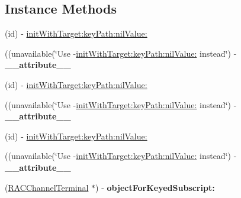 \subsection*{Instance Methods}
\begin{DoxyCompactItemize}
\item 
(id) -\/ \mbox{\hyperlink{interface_r_a_c_k_v_o_channel_a4a6f2925587bdcaf90419bae2da284a4}{init\+With\+Target\+:key\+Path\+:nil\+Value\+:}}
\item 
\mbox{\label{interface_r_a_c_k_v_o_channel_a42bbbc72fca05e4139053901df0c7a81}} 
((unavailable(\char`\"{}Use -\/\mbox{\hyperlink{interface_r_a_c_k_v_o_channel_a4a6f2925587bdcaf90419bae2da284a4}{init\+With\+Target\+:key\+Path\+:nil\+Value\+:}} instead\char`\"{}) -\/ {\bfseries \+\_\+\+\_\+attribute\+\_\+\+\_\+}
\item 
(id) -\/ \mbox{\hyperlink{interface_r_a_c_k_v_o_channel_a4a6f2925587bdcaf90419bae2da284a4}{init\+With\+Target\+:key\+Path\+:nil\+Value\+:}}
\item 
\mbox{\label{interface_r_a_c_k_v_o_channel_a42bbbc72fca05e4139053901df0c7a81}} 
((unavailable(\char`\"{}Use -\/\mbox{\hyperlink{interface_r_a_c_k_v_o_channel_a4a6f2925587bdcaf90419bae2da284a4}{init\+With\+Target\+:key\+Path\+:nil\+Value\+:}} instead\char`\"{}) -\/ {\bfseries \+\_\+\+\_\+attribute\+\_\+\+\_\+}
\item 
(id) -\/ \mbox{\hyperlink{interface_r_a_c_k_v_o_channel_a4a6f2925587bdcaf90419bae2da284a4}{init\+With\+Target\+:key\+Path\+:nil\+Value\+:}}
\item 
\mbox{\label{interface_r_a_c_k_v_o_channel_a42bbbc72fca05e4139053901df0c7a81}} 
((unavailable(\char`\"{}Use -\/\mbox{\hyperlink{interface_r_a_c_k_v_o_channel_a4a6f2925587bdcaf90419bae2da284a4}{init\+With\+Target\+:key\+Path\+:nil\+Value\+:}} instead\char`\"{}) -\/ {\bfseries \+\_\+\+\_\+attribute\+\_\+\+\_\+}
\item 
\mbox{\label{interface_r_a_c_k_v_o_channel_a7d637c08acb87250b575eecde893c6cd}} 
(\mbox{\hyperlink{interface_r_a_c_channel_terminal}{R\+A\+C\+Channel\+Terminal}} $\ast$) -\/ {\bfseries object\+For\+Keyed\+Subscript\+:}
\item 
\mbox{\label{interface_r_a_c_k_v_o_channel_a7d637c08acb87250b575eecde893c6cd}} 

\end{DoxyCompactItemize}

